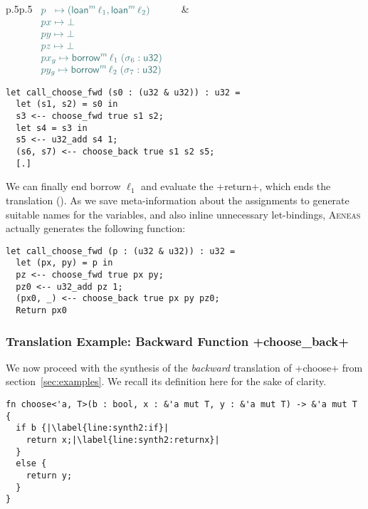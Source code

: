 \documentclass[acmsmall,screen]{acmart}
\newcommand{\Rule}[1]{\hyperlink{#1}{\TirName {#1}}}
\newcommand{\aeneas}{\textsc{Aeneas}\xspace}
\newcommand\kw[1]{\ensuremath{\mathsf{#1}}}
\newcommand\emborrow[2]{\ensuremath{\mathsf{borrow}^m\,#1\;#2}}
\newcommand\emloan[1]{\ensuremath{\mathsf{loan}^m\,#1}}
\begin{document}
\medskip
\noindent
\begin{tabular}{p{}p{}}
\small
$
\color{envcolor}
\begin{array}[t]{l}
  p \;\ \mapsto (\emloan\ell_1, \emloan\ell_2) \quad\\
  px \mapsto \bot \quad\\
  py \mapsto \bot \quad\\
  pz \mapsto \bot \quad\\
  px_g \mapsto \emborrow{\ell_1}(\sigma_6 : \kw{u32}) \quad\\
  py_g \mapsto \emborrow{\ell_2}(\sigma_7 : \kw{u32}) \quad\\
\end{array}
$
\normalsize
&
\begin{minipage}[t]{0.5\textwidth}
\begin{verbatim}
let call_choose_fwd (s0 : (u32 & u32)) : u32 =
  let (s1, s2) = s0 in
  s3 <-- choose_fwd true s1 s2;
  let s4 = s3 in
  s5 <-- u32_add s4 1;
  (s6, s7) <-- choose_back true s1 s2 s5;
  [.]
\end{verbatim}
\end{minipage}
\end{tabular}

\medskip
\noindent
We can finally end borrow $\ell_1$ and evaluate the \li+return+, which ends the
translation (\Rule{T-Return-Forward}). As we save meta-information about the assignments to generate suitable
names for the variables, and also inline unnecessary let-bindings, \aeneas actually generates the
following function:
\begin{verbatim}
let call_choose_fwd (p : (u32 & u32)) : u32 =
  let (px, py) = p in
  pz <-- choose_fwd true px py;
  pz0 <-- u32_add pz 1;
  (px0, _) <-- choose_back true px py pz0;
  Return px0
\end{verbatim}

\subsubsection{Translation Example: Backward Function \li+choose_back+}

We now proceed with the synthesis of the \emph{backward} translation of \li+choose+ from
section~\ref{sec:examples}. We recall its definition here for the sake of clarity.
\begin{verbatim}
fn choose<'a, T>(b : bool, x : &'a mut T, y : &'a mut T) -> &'a mut T {
  if b {|\label{line:synth2:if}|
    return x;|\label{line:synth2:returnx}|
  }
  else {
    return y;
  }
}
\end{verbatim}
\end{document}
